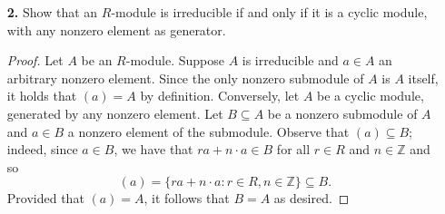 \documentclass[ 12pt ]{article}
\begin{document}
\begin{enumerate}
\begin{proof}
			\begin{align*}
				\pi_1 \iota_1(a) &= \pi_1(f(a) - a) & \pi_2 \iota_1(a) &= \pi_2(f(a) - a) \\
				&= f(f(a) - a) - (f(a) - a) & &= f(f(a) - a) \\
				&= f(f(a)) - f(a) - f(a) + a & &= f(f(a)) - f(a) \\
				&= f(a) - f(a) - f(a) + a & &= f(a) - f(a) \\
				\pi_1 \iota_1(a) &= a & \pi_2 \iota_1(a) &= 0.
			\end{align*}
			Similarly, if $a \in A$, we can see that
			\begin{align*}
				\pi_2 \iota_2(f(a)) &= \pi_2(f(a)) & \pi_1 \iota_2(f(a)) &= \pi_1(f(a)) \\
				&= f(f(a)) & &= f(f(a)) - f(a) \\
				\pi_2 \iota_2(f(a)) &= f(a) & &= f(a) - f(a) \\
				& & \pi_1 \iota_2(f(a)) &= 0.
			\end{align*}
			Lastly, observe that
			\begin{align*}
				(\iota_1 \pi_1 + \iota_2 \pi_2)(a) &= \iota_1 \pi_1(a) + \iota_2 \pi_2(a) \\
				&= \iota_1(f(a) - a) + \iota_2(f(a)) \\
				&= f(f(a) - a) - (f(a) - a) + f(a) \\
				&= f(f(a)) - f(a) - f(a) + a + f(a) \\
				&= f(a) - f(a) + a \\
				(\iota_1 \pi_1 + \iota_2 \pi_2)(a) &= a
			\end{align*}
			for all $a \in A$. Thus, $A \cong \mathrm{ker}\, f \oplus \mathrm{im}\, f$.
		\end{proof}


	\item[\textbf{2.}] Show that an $R$-module is irreducible if and only if it is a cyclic module, with any nonzero element as generator.

		\begin{proof}
			Let $A$ be an $R$-module. Suppose $A$ is irreducible and $a \in A$ an arbitrary nonzero element. Since the only nonzero submodule of $A$ is $A$ itself, it holds that $(a) = A$ by definition. Conversely, let $A$ be a cyclic module, generated by any nonzero element. Let $B \subseteq A$ be a nonzero submodule of $A$ and $a \in B$ a nonzero element of the submodule. Observe that $(a) \subseteq B$; indeed, since $a \in B$, we have that $ra + n \cdot a \in B$ for all $r \in R$ and $n \in \mathbb{Z}$ and so $$(a) = \{ ra + n \cdot a : r \in R, n \in \mathbb{Z} \} \subseteq B.$$ Provided that $(a) = A$, it follows that $B = A$ as desired.
		\end{proof}




\end{enumerate}
\end{document}
